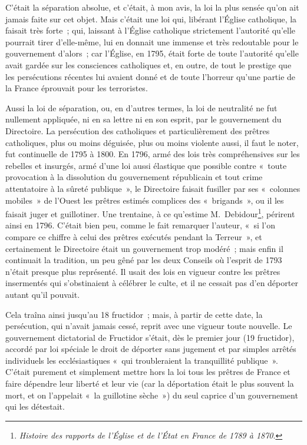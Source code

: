 \documentclass[french,twoside]{book} %
\begin{document}
C’était la séparation absolue, et c’était, à mon avis, la loi la plus sensée qu’on ait jamais faite sur cet objet. Mais c’était une loi qui, libérant l’Église catholique, la faisait très forte ; qui, laissant à l’Église catholique strictement l’autorité qu’elle pourrait tirer d’elle-même, lui en donnait une immense et très redoutable pour le gouvernement d’alors ; car l’Église, en 1795, était forte de toute l’autorité qu’elle avait gardée sur les consciences catholiques et, en outre, de tout le prestige que les persécutions récentes lui avaient donné et de toute l’horreur qu’une partie de la France éprouvait pour les terroristes.\par
 Aussi la loi de séparation, ou, en d’autres termes, la loi de neutralité ne fut nullement appliquée, ni en sa lettre ni en son esprit, par le gouvernement du Directoire. La persécution des catholiques et particulièrement des prêtres catholiques, plus ou moins déguisée, plus ou moins violente aussi, il faut le noter, fut continuelle de 1795 à 1800. En 1796, armé des lois très compréhensives sur les rebelles et insurgés, armé d’une loi aussi élastique que possible contre « toute provocation à la dissolution du gouvernement républicain et tout crime attentatoire à la sûreté publique », le Directoire faisait fusiller par ses « colonnes mobiles » de l’Ouest les prêtres estimés complices des « brigands », ou il les faisait juger et guillotiner. Une trentaine, à ce qu’estime M. Debidour\footnote{\emph{Histoire des rapports de l’Église et de l’État en France de 1789 à 1870}.}, périrent ainsi en 1796. C’était bien peu, comme le fait remarquer l’auteur, « si l’on compare ce chiffre à celui des prêtres exécutés pendant la Terreur », et certainement le Directoire était un gouvernement trop modéré ; mais enfin il continuait la tradition, un peu gêné par les deux Conseils où l’esprit de 1793 n’était presque plus représenté. Il usait des lois en vigueur contre les prêtres insermentés  qui s’obstinaient à célébrer le culte, et il ne cessait pas d’en déporter autant qu’il pouvait.\par
Cela traîna ainsi jusqu’au 18 fructidor ; mais, à partir de cette date, la persécution, qui n’avait jamais cessé, reprit avec une vigueur toute nouvelle. Le gouvernement dictatorial de Fructidor s’était, dès le premier jour (19 fructidor), accordé par loi spéciale le droit de déporter sans jugement et par simples arrêtés individuels les ecclésiastiques « qui troubleraient la tranquillité publique ». C’était purement et simplement mettre hors la loi tous les prêtres de France et faire dépendre leur liberté et leur vie (car la déportation était le plus souvent la mort, et on l’appelait « la guillotine sèche ») du seul caprice d’un gouvernement qui les détestait.\par
\end{document}
